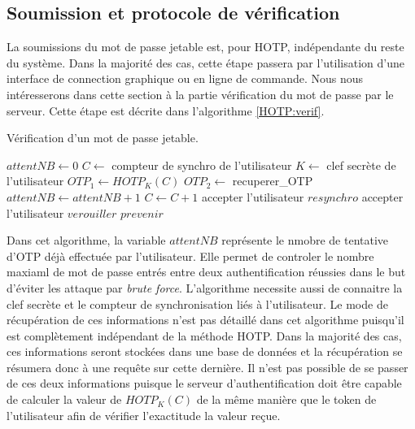 \documentclass{../res/univ-projet}
\begin{document}
  \subsection{Soumission et protocole de vérification}
  La soumissions du mot de passe jetable est, pour HOTP, indépendante du reste du système. Dans la majorité des cas, cette étape passera par l'utilisation d'une interface 
  de connection graphique ou en ligne de commande. Nous nous intéresserons dans cette section à la partie vérification du mot de passe par le serveur. Cette étape est 
  décrite dans l'algorithme \ref{HOTP:verif}.  
  \begin{algorithm}
    \caption{Vérification d'un mot de passe jetable.}
    \label{HOTP:verif}
    
    \begin{algorithmic}
      \STATE $attentNB \leftarrow 0$
      \STATE $C \leftarrow$ compteur de synchro de l'utilisateur
      \STATE $K \leftarrow$ clef secrète de l'utilisateur
      \STATE $OTP_1 \leftarrow HOTP_K(C)$
	\STATE $OTP_2 \leftarrow$ recuperer\_OTP
	\STATE $attentNB \leftarrow attentNB + 1$
	  \STATE $C \leftarrow C + 1$
	  \STATE accepter l'utilisateur
	\ELSE
	    \STATE $resynchro$
	    \STATE accepter l'utilisateur
	  \ENDIF
	\ENDIF
      \ENDWHILE
      \STATE $verouiller$
      \STATE $prevenir$
    \end{algorithmic}
  \end{algorithm}
  
  Dans cet algorithme, la variable $attentNB$ représente le nmobre de tentative d'OTP déjà effectuée par l'utilisateur. Elle permet de controler le nombre maxiaml de mot 
  de passe entrés entre deux authentification réussies dans le but d'éviter les attaque par \emph{brute force}.
  L'algorithme necessite aussi de connaitre la clef secrète et le compteur de synchronisation liés à l'utilisateur. Le mode de récupération de ces informations n'est pas 
  détaillé dans cet algorithme puisqu'il est complètement indépendant de la méthode HOTP. Dans la majorité des cas, ces informations seront stockées dans une base de 
  données et la récupération se résumera donc à une requ\^ete sur cette dernière. Il n'est pas possible de se passer de ces deux informations puisque le serveur 
  d'authentification doit \^etre capable de calculer la valeur de $HOTP_K(C)$ de la m\^eme manière que le token de l'utilisateur afin de vérifier l'exactitude la valeur 
  re\c{c}ue.
  
\end{document}
